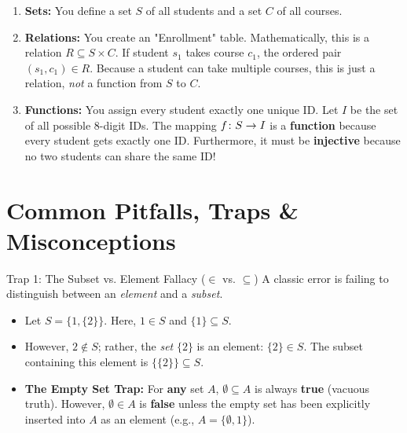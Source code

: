 \begin{enumerate}
    \item \textbf{Sets:} You define a set $S$ of all students and a set $C$ of all courses. 
    \item \textbf{Relations:} You create an "Enrollment" table. Mathematically, this is a relation $R \subseteq S \times C$. If student $s_1$ takes course $c_1$, the ordered pair $(s_1, c_1) \in R$. Because a student can take multiple courses, this is just a relation, \textit{not} a function from $S$ to $C$.
    \item \textbf{Functions:} You assign every student exactly one unique ID. Let $I$ be the set of all possible 8-digit IDs. The mapping $f \colon S \to I$ is a \textbf{function} because every student gets exactly one ID. Furthermore, it must be \textbf{injective} because no two students can share the same ID!
\end{enumerate}

\section{Common Pitfalls, Traps \& Misconceptions}

\begin{trapbox}{Trap 1: The Subset vs. Element Fallacy ($\in$ vs. $\subseteq$)}
A classic error is failing to distinguish between an \textit{element} and a \textit{subset}.
\begin{itemize}
    \item Let $S = \{1, \{2\}\}$. Here, $1 \in S$ and $\{1\} \subseteq S$. 
    \item However, $2 \notin S$; rather, the \textit{set} $\{2\}$ is an element: $\{2\} \in S$. The subset containing this element is $\{\{2\}\} \subseteq S$.
    \item \textbf{The Empty Set Trap:} For \textbf{any} set $A$, $\emptyset \subseteq A$ is always \textbf{true} (vacuous truth). However, $\emptyset \in A$ is \textbf{false} unless the empty set has been explicitly inserted into $A$ as an element (e.g., $A = \{\emptyset, 1\}$).
\end{itemize}
\end{trapbox}

